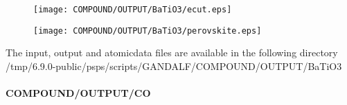 \documentclass[onecolumn]{revtex4}
\begin{document}
\begin{figure}[h] 
\centering 
\texttt{[image: COMPOUND/OUTPUT/BaTiO3/ecut.eps]}
\end{figure}
\begin{figure}[h] 
\centering 
\texttt{[image: COMPOUND/OUTPUT/BaTiO3/perovskite.eps]}
\end{figure}
\begin{htmlonly} 
The input, output and atomicdata files are available in the following directory 
  {/tmp/6.9.0-public/psps/scripts/GANDALF/COMPOUND/OUTPUT/BaTiO3} 
\end{htmlonly} 
\newpage
\paragraph*{\bf{COMPOUND/OUTPUT/CO}}
\end{document}
